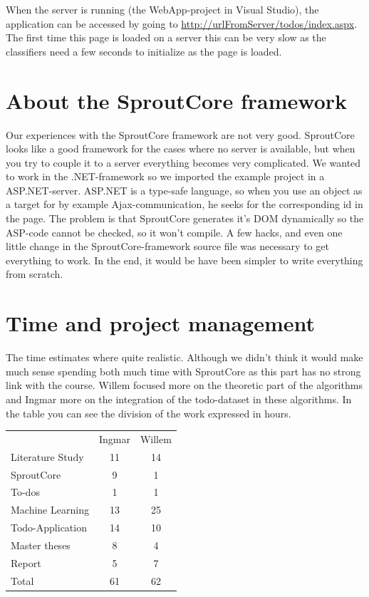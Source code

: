 \documentclass[a4paper,titlepage]{article}
\begin{document}
When the server is running (the WebApp-project in Visual Studio), the application can be accessed by going to \url{http://urlFromServer/todos/index.aspx}. The first time this page is loaded on a server this can be very slow as the classifiers need a few seconds to initialize as the page is loaded.

\section{About the SproutCore framework}
Our experiences with the SproutCore framework are not very good. SproutCore looks like a good framework for the cases where no server is available, but when you try to couple it to a server everything becomes very complicated. We wanted to work in the .NET-framework so we imported the example project in a ASP.NET-server. ASP.NET is a type-safe language, so when you use an object as a target for by example Ajax-communication, he seeks for the corresponding id in the page. 
The problem is that SproutCore generates it's DOM dynamically so the ASP-code cannot be checked, so it won't compile. A few hacks, and even one little change in the SproutCore-framework source file was necessary to get everything to work. In the end, it would be have been simpler to write everything from scratch. 

\section{Time and project management}
The time estimates where quite realistic. Although we didn't think it would make much sense spending both much time with SproutCore as this part has no strong link with the course. Willem focused more on the theoretic part of the algorithms and Ingmar more on the integration of the todo-dataset in these algorithms. In the table you can see the division of the work expressed in hours.
\begin{table}[H]
\centering
\begin{tabular}{lcc}
&Ingmar&Willem \\
Literature Study & 11 & 14\\
SproutCore & 9 & 1\\
To-dos & 1 & 1\\
Machine Learning & 13 & 25\\
Todo-Application & 14 & 10 \\
Master theses & 8 & 4\\
Report & 5 & 7\\
\hline
Total & 61 & 62
\end{tabular}
\end{table}
\end{document}
